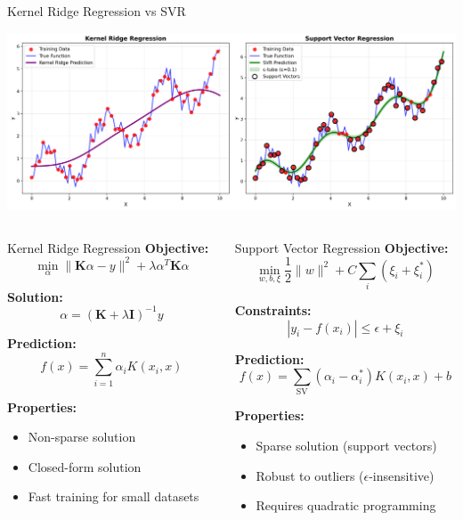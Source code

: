 \documentclass[8pt,aspectratio=1610]{beamer}
\begin{document}
\begin{frame}{Kernel Ridge Regression vs SVR}
\begin{center}
\includegraphics[width=\textwidth]{../figures/kernel_ridge_vs_svr.png}
\end{center}

\begin{columns}[t]
\begin{column}{0.48\textwidth}
\begin{block}{Kernel Ridge Regression}
\textbf{Objective:}
$$\min_\alpha \|\mathbf{K}\alpha - y\|^2 + \lambda \alpha^T \mathbf{K} \alpha$$

\textbf{Solution:}
$$\alpha = (\mathbf{K} + \lambda \mathbf{I})^{-1} y$$

\textbf{Prediction:}
$$f(x) = \sum_{i=1}^n \alpha_i K(x_i, x)$$
\end{block}

\vspace{0.3cm}
\textbf{Properties:}
\begin{itemize}
\setlength{\itemsep}{1pt}
\item Non-sparse solution
\item Closed-form solution
\item Fast training for small datasets
\end{itemize}
\end{column}

\begin{column}{0.48\textwidth}
\begin{block}{Support Vector Regression}
\textbf{Objective:}
$$\min_{w,b,\xi} \frac{1}{2}\|w\|^2 + C\sum_i (\xi_i + \xi_i^*)$$

\textbf{Constraints:}
$$|y_i - f(x_i)| \leq \epsilon + \xi_i$$

\textbf{Prediction:}
$$f(x) = \sum_{\text{SV}} (\alpha_i - \alpha_i^*) K(x_i, x) + b$$
\end{block}

\vspace{0.3cm}
\textbf{Properties:}
\begin{itemize}
\setlength{\itemsep}{1pt}
\item Sparse solution (support vectors)
\item Robust to outliers ($\epsilon$-insensitive)
\item Requires quadratic programming
\end{itemize}
\end{column}
\end{columns}
\end{frame}
\end{document}
